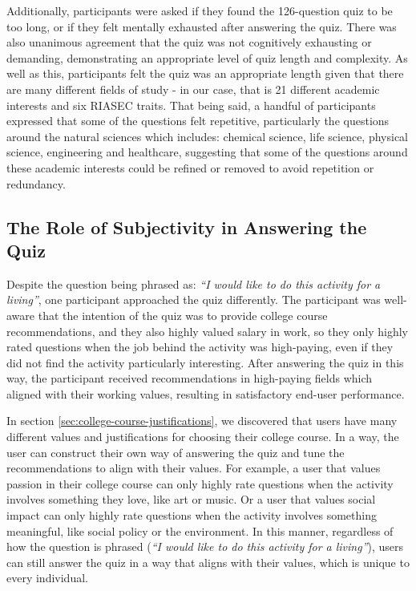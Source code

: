 Additionally, participants were asked if they found the 126-question quiz to be too long,
or if they felt mentally exhausted after answering the quiz.
There was also unanimous agreement that the quiz was not cognitively exhausting or demanding,
demonstrating an appropriate level of quiz length and complexity.
As well as this, participants felt the quiz was an appropriate length given that 
there are many different fields of study - in our case, that is 21 different academic interests and six RIASEC traits.
That being said, a handful of participants expressed that some of the questions felt repetitive,
particularly the questions around the natural sciences which includes:
chemical science, life science, physical science, engineering
and healthcare, suggesting that some of the questions around these academic interests could be refined or removed 
to avoid repetition or redundancy.

\subsection{The Role of Subjectivity in Answering the Quiz}

Despite the question being phrased as: \emph{``I would like to do this activity for a living''},
one participant approached the quiz differently.
The participant was well-aware that the intention of the quiz was to provide college course recommendations,
and they also highly valued salary in work, so they only highly rated questions 
when the job behind the activity was high-paying,
even if they did not find the activity particularly interesting.
After answering the quiz in this way, 
the participant received recommendations in high-paying fields which aligned with their working values,
resulting in satisfactory end-user performance.

In section \ref{sec:college-course-justifications},
we discovered that users have many different values and justifications for choosing their college course.
In a way,
the user can construct their own way of answering the quiz
and tune the recommendations to align with their values.
For example, a user that values passion in their college course can only highly rate questions 
when the activity involves something they love, like art or music.
Or a user that values social impact can only highly rate questions when the activity involves something 
meaningful, like social policy or the environment.
In this manner, regardless of how the question is phrased (\emph{``I would like to do this activity for a living''}),
users can still answer the quiz in a way that aligns with their values,
which is unique to every individual.

